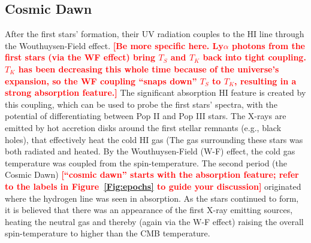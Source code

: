 \documentclass[12pt,a4paper]{report}
\newcommand{\attention}[1]{\textcolor{red}{\bf {#1}}}
\begin{document}
%	
	\subsection{Cosmic Dawn}
	    
	    After the first stars' formation, their UV radiation couples to the HI line through the Wouthuysen-Field effect. \attention{[Be more specific here.  Ly$\alpha$ photons from the first stars (via the WF effect) bring $T_S$ and $T_K$ back into tight coupling.  $T_K$ has been decreasing this whole time because of the universe's expansion, so the WF coupling ``snaps down'' $T_S$ to $T_K$, resulting in a strong absorption feature.]} The significant absorption HI feature is created by this coupling, which can be used to probe the first stars' spectra, with the potential of differentiating between Pop II and Pop III stars. The X-rays are emitted by hot accretion disks around the first stellar remnants (e.g., black holes), that effectively heat the cold HI gas (The gas surrounding these stars was both radiated and heated. By the Wouthuysen-Field (W-F) effect, the cold gas temperature was coupled from the spin-temperature. The second period (the Cosmic Dawn) \attention{[``cosmic dawn'' starts with the absorption feature; refer to the labels in Figure~\ref{Fig:epochs} to guide your discussion]} originated where the hydrogen line was seen in absorption. As the stars continued to form, it is believed that there was an appearance of the first X-ray emitting sources, heating the neutral gas and thereby (again via the W-F effect) raising the overall spin-temperature to higher than the CMB temperature.\\
	    
\end{document}
